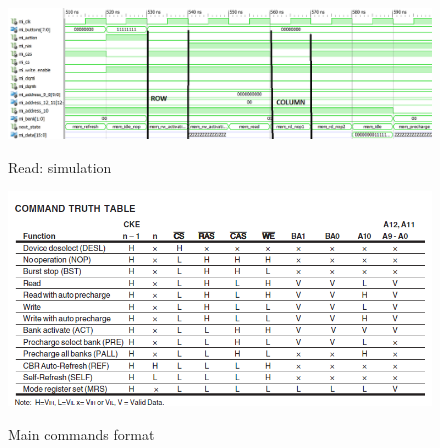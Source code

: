 \begin{figure}[H]
\centering
\includegraphics[scale=.5]{Immagini/32}
\label{32}
\caption{Read: simulation}
\end{figure}

\begin{figure}[H]
\centering
\includegraphics[scale=.8]{Immagini/35}
\label{35}
\caption{Main commands format}
\end{figure}